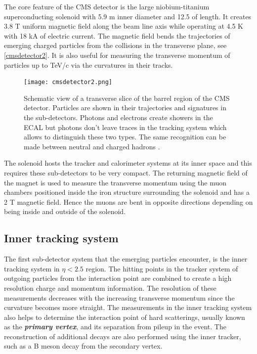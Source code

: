 The core feature of the CMS detector is the large niobium-titanium superconducting solenoid with 5.9 m inner diameter and 12.5 of length. It creates 3.8 T uniform magnetic field along the beam line axis while operating at 4.5 K with 18 kA of electric current. The magnetic field bends the trajectories of emerging charged particles from the collisions in the transverse plane, see \autoref{cmsdetector2}. It is also useful for measuring the transverse momentum of particles up to TeV/c via the curvatures in their tracks.

\begin{figure}[ht]
	\centering
	\texttt{[image: cmsdetector2.png]}
	\vspace{2mm}
	\caption[Schematic view of a transverse slice of the barrel region of the CMS detector. Particles are shown in their trajectories and signatures in the sub-detectors. Photons and electrons create showers in the ECAL but photons don't leave traces in the tracking system which allows to distinguish these two types. The same recognition can be made between neutral and charged hadrons.]{Schematic view of a transverse slice of the barrel region of the CMS detector. Particles are shown in their trajectories and signatures in the sub-detectors. Photons and electrons create showers in the ECAL but photons don't leave traces in the tracking system which allows to distinguish these two types. The same recognition can be made between neutral and charged hadrons \cite{Barney:2120661}.}
	\label{cmsdetector2}
\end{figure}

The solenoid hosts the tracker and calorimeter systems at its inner space and this requires these sub-detectors to be very compact. The returning magnetic field of the magnet is used to measure the transverse momentum using the muon chambers positioned inside the iron structure surrounding the solenoid and has a 2 T magnetic field. Hence the muons are bent in opposite directions depending on being inside and outside of the solenoid.

\subsection{Inner tracking system}

The first sub-detector system that the emerging particles encounter, is the inner tracking system in $\eta < 2.5$ region. The hitting points in the tracker system of outgoing particles from the interaction point are combined to create a high resolution charge and momentum information. The resolution of these measurements decreases with the increasing transverse momentum since the curvature becomes more straight. The measurements in the inner tracking system also helps to determine the interaction point of hard scatterings, usually known as the \textbf{\emph{primary vertex}}, and its separation from pileup in the event. The reconstruction of additional decays are also performed using the inner tracker, such as a B meson decay from the secondary vertex.

